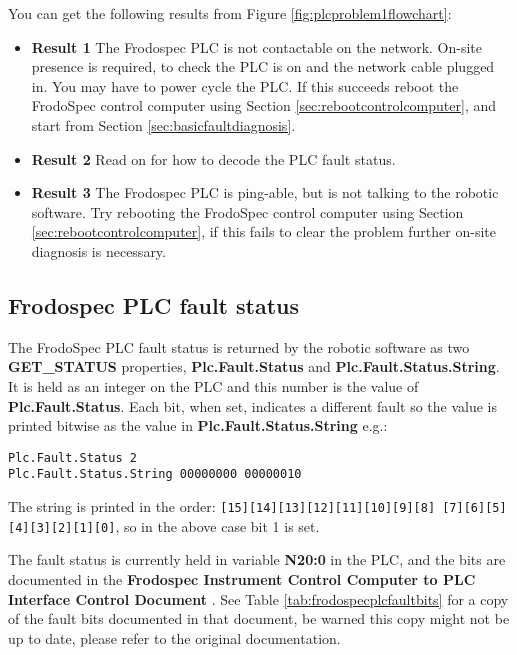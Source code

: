 \documentclass[10pt,a4paper]{article}
\begin{document}
You can get the following results from Figure \ref{fig:plcproblem1flowchart}:

\begin{itemize}
\item {\bf Result 1} The Frodospec PLC is not contactable on the network. On-site presence is required, to check
the PLC is on and the network cable plugged in. You may have to power cycle the PLC. If this succeeds reboot the 
FrodoSpec control computer using Section \ref{sec:rebootcontrolcomputer}, 
and start from Section \ref{sec:basicfaultdiagnosis}.
\item {\bf Result 2} Read on for how to decode the PLC fault status.
\item {\bf Result 3} The Frodospec PLC is ping-able, but is not talking to the robotic software. Try rebooting the 
FrodoSpec control computer using Section \ref{sec:rebootcontrolcomputer}, if this fails to clear the problem further
on-site diagnosis is necessary.
\end{itemize}

\subsection{Frodospec PLC fault status}

The FrodoSpec PLC fault status is returned by the robotic software as two {\bf GET\_STATUS} properties, {\bf Plc.Fault.Status} and {\bf Plc.Fault.Status.String}. It is held as an integer on the PLC and this number is the value of {\bf Plc.Fault.Status}. Each bit, when set, indicates a different fault so the value is printed bitwise as the value in {\bf Plc.Fault.Status.String} e.g.:

\begin{verbatim}
Plc.Fault.Status 2
Plc.Fault.Status.String 00000000 00000010
\end{verbatim}

The string is printed in the order: \verb'[15][14][13][12][11][10][9][8] [7][6][5][4][3][2][1][0]', so in the
above case bit 1 is set.

The fault status is currently held in variable {\bf N20:0} in the PLC, and the bits are documented in the {\bf Frodospec Instrument Control Computer to PLC Interface Control Document} \cite{bib:frodospeciccfplcicd}. See Table \ref{tab:frodospecplcfaultbits} for a copy of the fault bits documented in that document, be warned this copy might not be up to date, please refer to the original documentation.
\end{document}
